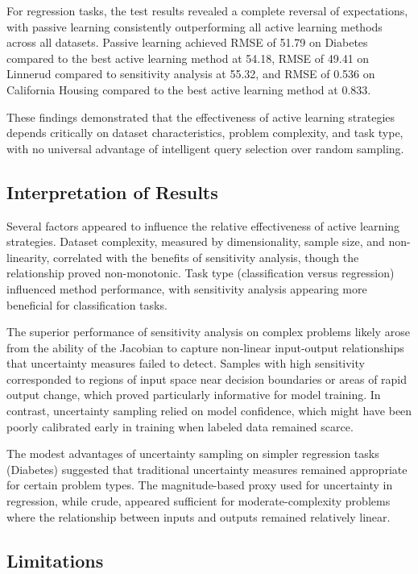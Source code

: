 \documentclass[conference]{IEEEtran}
\begin{document}
For regression tasks, the test results revealed a complete reversal of expectations, with passive learning consistently outperforming all active learning methods across all datasets. Passive learning achieved RMSE of 51.79 on Diabetes compared to the best active learning method at 54.18, RMSE of 49.41 on Linnerud compared to sensitivity analysis at 55.32, and RMSE of 0.536 on California Housing compared to the best active learning method at 0.833.

These findings demonstrated that the effectiveness of active learning strategies depends critically on dataset characteristics, problem complexity, and task type, with no universal advantage of intelligent query selection over random sampling.

\subsection{Interpretation of Results}

Several factors appeared to influence the relative effectiveness of active learning strategies. Dataset complexity, measured by dimensionality, sample size, and non-linearity, correlated with the benefits of sensitivity analysis, though the relationship proved non-monotonic. Task type (classification versus regression) influenced method performance, with sensitivity analysis appearing more beneficial for classification tasks.

The superior performance of sensitivity analysis on complex problems likely arose from the ability of the Jacobian to capture non-linear input-output relationships that uncertainty measures failed to detect. Samples with high sensitivity corresponded to regions of input space near decision boundaries or areas of rapid output change, which proved particularly informative for model training. In contrast, uncertainty sampling relied on model confidence, which might have been poorly calibrated early in training when labeled data remained scarce.

The modest advantages of uncertainty sampling on simpler regression tasks (Diabetes) suggested that traditional uncertainty measures remained appropriate for certain problem types. The magnitude-based proxy used for uncertainty in regression, while crude, appeared sufficient for moderate-complexity problems where the relationship between inputs and outputs remained relatively linear.

\subsection{Limitations}
\end{document}

